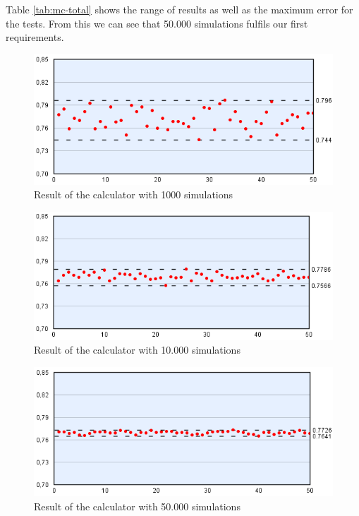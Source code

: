 Table \ref{tab:mc-total} shows the range of results as well as the maximum error for the tests. From this we can see that 50.000 simulations fulfils our first requirements.

\begin{figure}[H]
  \center
    \includegraphics[scale=0.775]{images/MonteCarlo/1k.png}
  \caption{Result of the calculator with 1000 simulations \label{fig:mc1}}
\end{figure}

\begin{figure}[H]
  \center
    \includegraphics[scale=0.775]{images/MonteCarlo/10k.png}
  \caption{Result of the calculator with 10.000 simulations \label{fig:mc10}}
\end{figure}

\begin{figure}[H]
  \center
    \includegraphics[scale=0.775]{images/MonteCarlo/50k.png}
  \caption{Result of the calculator with 50.000 simulations \label{fig:mc50}}
\end{figure}

